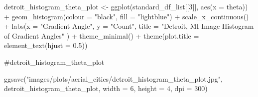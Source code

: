 \documentclass[
  letterpaper,
  DIV=11,
  numbers=noendperiod]{scrreprt}
\newenvironment{Shaded}{\begin{snugshade}}{\end{snugshade}}
\newcommand{\AttributeTok}[1]{\textcolor[rgb]{0.40,0.45,0.13}{#1}}
\newcommand{\CommentTok}[1]{\textcolor[rgb]{0.37,0.37,0.37}{#1}}
\newcommand{\DecValTok}[1]{\textcolor[rgb]{0.68,0.00,0.00}{#1}}
\newcommand{\FloatTok}[1]{\textcolor[rgb]{0.68,0.00,0.00}{#1}}
\newcommand{\FunctionTok}[1]{\textcolor[rgb]{0.28,0.35,0.67}{#1}}
\newcommand{\NormalTok}[1]{\textcolor[rgb]{0.00,0.23,0.31}{#1}}
\newcommand{\OtherTok}[1]{\textcolor[rgb]{0.00,0.23,0.31}{#1}}
\newcommand{\SpecialCharTok}[1]{\textcolor[rgb]{0.37,0.37,0.37}{#1}}
\newcommand{\StringTok}[1]{\textcolor[rgb]{0.13,0.47,0.30}{#1}}
\begin{document}
\begin{Shaded}
\begin{Highlighting}[]
\NormalTok{detroit\_histogram\_theta\_plot }\OtherTok{\textless{}{-}}
  \FunctionTok{ggplot}\NormalTok{(standard\_df\_list[[}\DecValTok{3}\NormalTok{]], }
         \FunctionTok{aes}\NormalTok{(}\AttributeTok{x =}\NormalTok{ theta)) }\SpecialCharTok{+}
  \FunctionTok{geom\_histogram}\NormalTok{(}\AttributeTok{colour =} \StringTok{"black"}\NormalTok{, }\AttributeTok{fill =} \StringTok{"lightblue"}\NormalTok{) }\SpecialCharTok{+}
  \FunctionTok{scale\_x\_continuous}\NormalTok{() }\SpecialCharTok{+} 
  \FunctionTok{labs}\NormalTok{(}\AttributeTok{x =} \StringTok{"Gradient Angle"}\NormalTok{, }
       \AttributeTok{y =} \StringTok{"Count"}\NormalTok{, }
       \AttributeTok{title =} \StringTok{"Detroit, MI Image Histogram of Gradient Angles"}
\NormalTok{       ) }\SpecialCharTok{+}
  \FunctionTok{theme\_minimal}\NormalTok{() }\SpecialCharTok{+}
  \FunctionTok{theme}\NormalTok{(}\AttributeTok{plot.title =} \FunctionTok{element\_text}\NormalTok{(}\AttributeTok{hjust =} \FloatTok{0.5}\NormalTok{))}

\CommentTok{\#detroit\_histogram\_theta\_plot}

\FunctionTok{ggsave}\NormalTok{(}\StringTok{"images/plots/aerial\_cities/detroit\_histogram\_theta\_plot.jpg"}\NormalTok{, detroit\_histogram\_theta\_plot, }\AttributeTok{width =} \DecValTok{6}\NormalTok{, }\AttributeTok{height =} \DecValTok{4}\NormalTok{, }\AttributeTok{dpi =} \DecValTok{300}\NormalTok{)}
\end{Highlighting}
\end{Shaded}
\end{document}
